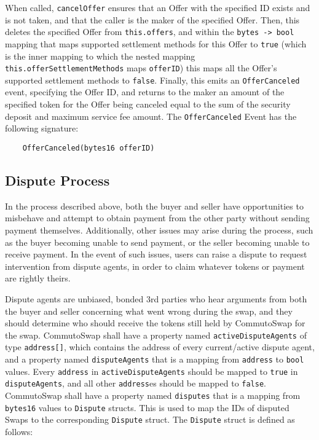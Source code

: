 \documentclass[11pt]{article}
\begin{document}
    When called, \verb|cancelOffer| ensures that an Offer with the specified ID exists and is not
    taken, and that the caller is the maker of the specified Offer.
    Then, this deletes the specified Offer from \verb|this.offers|, and within the
    \verb|bytes -> bool| mapping that maps supported settlement methods for this Offer to
    \verb|true| (which is the inner mapping to which the nested mapping
    \verb|this.offerSettlementMethods| maps \verb|offerID|) this maps all the Offer's supported
    settlement methods to \verb|false|.
    Finally, this emits an \verb|OfferCanceled| event, specifying the Offer ID\@, and returns to the
    maker an amount of the specified token for the Offer being canceled equal to the sum of the
    security deposit and maximum service fee amount.
    The \verb|OfferCanceled| Event has the following signature:
    \begin{verbatim}
    OfferCanceled(bytes16 offerID)
    \end{verbatim}

    \subsection*{Dispute Process}
    In the process described above, both the buyer and seller have opportunities to misbehave and
    attempt to obtain payment from the other party without sending payment themselves.
    Additionally, other issues may arise during the process, such as the buyer becoming unable to
    send payment, or the seller becoming unable to receive payment.
    In the event of such issues, users can raise a dispute to request intervention from dispute
    agents, in order to claim whatever tokens or payment are rightly theirs.

    Dispute agents are unbiased, bonded 3rd parties who hear arguments from both the buyer and
    seller concerning what went wrong during the swap, and they should determine who should receive
    the tokens still held by CommutoSwap for the swap.
    CommutoSwap shall have a property named \verb|activeDisputeAgents| of type \verb|address[]|,
    which contains the address of every current/active dispute agent, and a property named
    \verb|disputeAgents| that is a mapping from \verb|address| to \verb|bool| values.
    Every \verb|address| in \verb|activeDisputeAgents| should be mapped to \verb|true| in
    \verb|disputeAgents|, and all other \verb|address|es should be mapped to \verb|false|.
    CommutoSwap shall have a property named \verb|disputes| that is a mapping from \verb|bytes16|
    values to \verb|Dispute| structs.
    This is used to map the IDs of disputed Swaps to the corresponding \verb|Dispute| struct.
    The \verb|Dispute| struct is defined as follows:
    \begin{longtable}[p]{ |p{2.5cm}|p{4cm}|p{7cm}| }

    \end{longtable}
\end{document}
